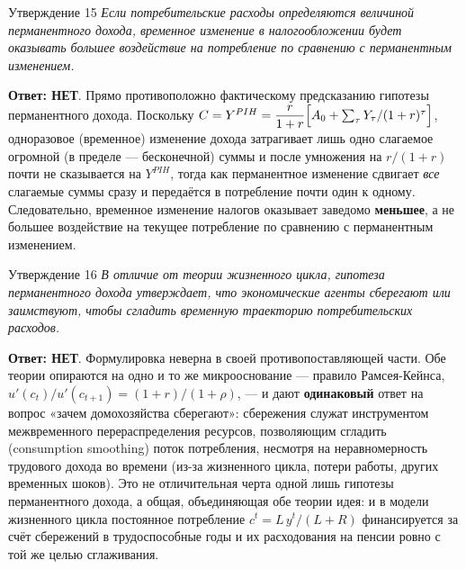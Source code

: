 \documentclass[10pt,a4paper]{article}
\newcommand{\qnet}{\textbf{\color{nored}Ответ: НЕТ}}
\newenvironment{answer}[2]{%
  \begin{qbox}{Утверждение #1}
  \textit{#2}\par\smallskip
}{%
  \end{qbox}\vspace{2pt}
}
\begin{document}
\begin{answer}{15}{Если потребительские расходы определяются величиной перманентного дохода, временное изменение в налогообложении будет оказывать большее воздействие на потребление по сравнению с перманентным изменением.}
\qnet. Прямо противоположно фактическому предсказанию гипотезы перманентного дохода. Поскольку $C=Y^{PIH}=\dfrac{r}{1+r}\Bigl[A_0+\sum_\tau Y_\tau/(1+r)^\tau\Bigr]$, одноразовое (временное) изменение дохода затрагивает лишь одно слагаемое огромной (в пределе — бесконечной) суммы и после умножения на $r/(1+r)$ почти не сказывается на $Y^{PIH}$, тогда как перманентное изменение сдвигает \emph{все} слагаемые суммы сразу и передаётся в потребление почти один к одному. Следовательно, временное изменение налогов оказывает заведомо \textbf{меньшее}, а не большее воздействие на текущее потребление по сравнению с перманентным изменением.
\end{answer}
 
\begin{answer}{16}{В отличие от теории жизненного цикла, гипотеза перманентного дохода утверждает, что экономические агенты сберегают или заимствуют, чтобы сгладить временную траекторию потребительских расходов.}
\qnet. Формулировка неверна в своей противопоставляющей части. Обе теории опираются на одно и то же микрооснование — правило Рамсея-Кейнса, $u'(c_t)/u'(c_{t+1})=(1+r)/(1+\rho)$, — и дают \textbf{одинаковый} ответ на вопрос «зачем домохозяйства сберегают»: сбережения служат инструментом межвременного перераспределения ресурсов, позволяющим сгладить (consumption smoothing) поток потребления, несмотря на неравномерность трудового дохода во времени (из-за жизненного цикла, потери работы, других временных шоков). Это не отличительная черта одной лишь гипотезы перманентного дохода, а общая, объединяющая обе теории идея: и в модели жизненного цикла постоянное потребление $c^t=L\,y^t/(L+R)$ финансируется за счёт сбережений в трудоспособные годы и их расходования на пенсии ровно с той же целью сглаживания.
\end{answer}
 
\end{document}
